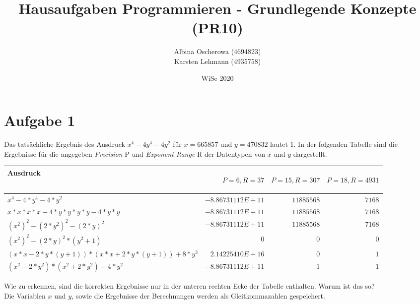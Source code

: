 \documentclass{article}
\author{
  Albina Oscherowa (4694823) \\
  Karsten Lehmann (4935758)
}
\date{WiSe 2020}
\title{Hausaufgaben Programmieren - Grundlegende Konzepte (PR10)}
\begin{document}
\maketitle

\newpage

\section*{Aufgabe 1}

Das tatsächliche Ergebnis des Ausdruck $x^4 - 4y^4 - 4y^2$ für $x = 665857$ und $y = 470832$ lautet $1$.
In der folgenden Tabelle sind die Ergebnisse für die angegeben \emph{Precision} P und \emph{Exponent Range} R
der Datentypen von $x$ und $y$ dargestellt.

{
  \footnotesize
  \begin{tabularx}{\textwidth}{X | r | r | r}
    Ausdruck & \begin{sideways}$P=6, R=37$\end{sideways} & \begin{sideways}$P=15, R=307$\end{sideways} & \begin{sideways}$P=18, R=4931$\end{sideways} \\
    \hline
    $x^4 - 4*y^4 - 4*y^2$                       & $-8.86731112E+11$ & $11885568$ & $7168$ \\
    $x*x*x*x - 4*y*y*y*y - 4*y*y$               & $-8.86731112E+11$ & $11885568$ & $7168$ \\
    $(x^2)^2 - (2*y^2)^2 - (2*y)^2$             & $-8.86731112E+11$ & $11885568$ & $7168$ \\
    $(x^2)^2 - (2*y)^2*(y^2 + 1)$               & $0$               & $0$        & $0$    \\
    $(x*x-2*y*(y+1)) * (x*x+2*y*(y+1)) + 8*y^3$ & $2.14225410E+16$  & $0$        & $1$    \\
    $(x^2-2*y^2) * (x^2+2*y^2) - 4*y^2$         & $-8.86731112E+11$ & $1$        & $1$    \\
  \end{tabularx}
}

\noindent
Wie zu erkennen, sind die korrekten Ergebnisse nur in der unteren rechten Ecke der Tabelle enthalten.
Warum ist das so? \\

\noindent
Die Variablen $x$ und $y$, sowie die Ergebnisse der Berechnungen werden als Gleitkommazahlen gespeichert. \\
\end{document}
